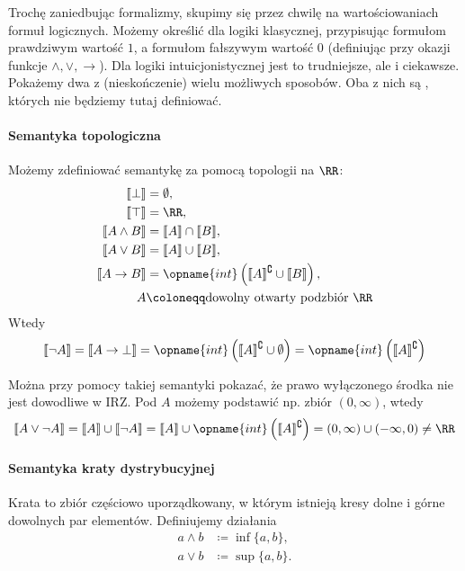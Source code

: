 \documentclass[polish,pretty]{angav}
\begin{document}
Trochę zaniedbując formalizmy, skupimy się przez chwilę na wartościowaniach formuł logicznych. Możemy określić  dla logiki klasycznej, przypisując formułom prawdziwym wartość $1$, a formułom fałszywym wartość $0$ (definiując przy okazji funkcje $\land, \lor, \to$). Dla logiki intuicjonistycznej jest to trudniejsze, ale i ciekawsze. Pokażemy dwa z (nieskończenie) wielu możliwych sposobów. Oba z nich są , których nie będziemy tutaj definiować.

\paragraph{Semantyka topologiczna}
Możemy zdefiniować semantykę za pomocą topologii na $\RR$:
\begin{align*}
    \llbracket \bot \rrbracket &= \emptyset, \\
    \llbracket \top \rrbracket &= \RR, \\
    \llbracket A \land B \rrbracket &= \llbracket A \rrbracket \cap \llbracket B \rrbracket, \\
    \llbracket A \lor B \rrbracket &= \llbracket A \rrbracket \cup \llbracket B \rrbracket, \\
    \llbracket A \to B \rrbracket &= \opname{int}\left(\llbracket A \rrbracket^\complement \cup \llbracket B \rrbracket\right), \\
    A &\coloneqq \text{dowolny otwarty podzbiór $\RR$}
\end{align*}
Wtedy
\[ \llbracket \neg A \rrbracket = \llbracket A \to \bot \rrbracket = \opname{int}\left(\llbracket A \rrbracket^\complement \cup \emptyset\right) = \opname{int}\left(\llbracket A \rrbracket^\complement\right) \]

Można przy pomocy takiej semantyki pokazać, że prawo wyłączonego środka nie jest dowodliwe w IRZ. Pod $A$ możemy podstawić np. zbiór $(0, \infty)$, wtedy
\[ \llbracket A \lor \neg A \rrbracket = \llbracket A \rrbracket \cup \llbracket \neg A \rrbracket = \llbracket A \rrbracket \cup \opname{int}\left(\llbracket A \rrbracket^\complement\right) = (0, \infty) \cup (-\infty, 0) \neq \RR \]

\paragraph{Semantyka kraty dystrybucyjnej}
Krata to zbiór częściowo uporządkowany, w którym istnieją kresy dolne i górne dowolnych par elementów. Definiujemy działania
\begin{align*}
    a \land b &\coloneqq \inf\{a, b\}, \\
    a \lor b &\coloneqq \sup\{a, b\}.
\end{align*}
\end{document}
